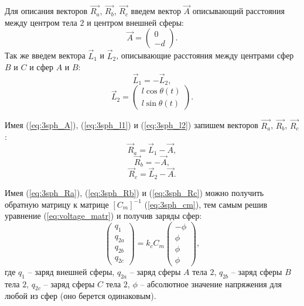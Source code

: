 Для описания векторов $\vec{R_a}$, $\vec{R_b}$, $\vec{R_c}$ введем вектор $\vec{A}$  описывающий расстояния между центром тела $2$ и центром внешней сферы:
\begin{equation}
\label{eq:3sph_A}
	\vec{A} =
	\begin{pmatrix}
		0\\
		-d
	\end{pmatrix}.
\end{equation}
Так же введем вектора $\vec{L}_1$ и $\vec{L}_2$, описывающие расстояния между центрами сфер $B$ и $C$ и сфер $A$ и $B$:
\begin{equation}
\label{eq:3sph_l1}
	\vec{L}_1 = -\vec{L}_2,
\end{equation}
\begin{equation}
\label{eq:3sph_l2}
	\vec{L}_2 = 
	\begin{pmatrix}
		l \cos \theta(t)\\
		l \sin \theta(t)
	\end{pmatrix}.
\end{equation}

Имея (\ref{eq:3sph_A}), (\ref{eq:3sph_l1}) и (\ref{eq:3sph_l2}) запишем векторов $\vec{R_a}$, $\vec{R_b}$, $\vec{R_c}$:
\begin{equation}
\label{eq:3sph_Ra}
	\vec{R}_a = \vec{L}_1 - \vec{A},
\end{equation}
\begin{equation}
\label{eq:3sph_Rb}
	\vec{R}_b = -\vec{A},
\end{equation}
\begin{equation}
\label{eq:3sph_Rc}
	\vec{R}_c = \vec{L}_2 - \vec{A}.
\end{equation}

Имея (\ref{eq:3sph_Ra}), (\ref{eq:3sph_Rb}) и (\ref{eq:3sph_Rc}) можно получить обратную матрицу к матрице $[C_m]^{-1}$ (\ref{eq:3sph_cm}), тем самым решив уравнение (\ref{eq:voltage_matr}) и получив заряды сфер:
\begin{equation}
\label{eq:3sph_q_eq}
	\begin{pmatrix}
		q_1\\
		q_{2a}\\
		q_{2b}\\
		q_{2c}
	\end{pmatrix}
	= k_c C_m 
	\begin{pmatrix}
		-\phi\\
		\phi\\
		\phi\\
		\phi
	\end{pmatrix},
\end{equation}
где $q_1$ – заряд внешней сферы, $q_{2a}$ – заряд сферы $A$ тела $2$, $q_{2b}$ – заряд сферы $B$ тела $2$, $q_{2c}$ – заряд сферы $C$ тела $2$, $\phi$ – абсолютное значение напряжения для любой из сфер (оно берется одинаковым). 


